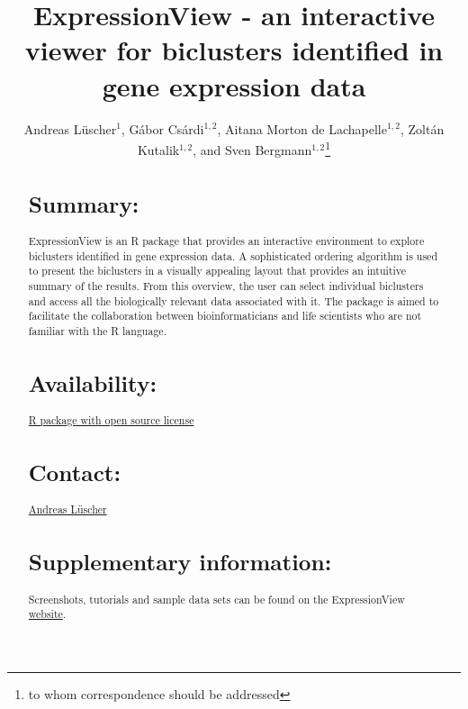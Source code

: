 \documentclass[round]{bioinfo}
\begin{document}
\application{}
\title[ExpressionView]{ExpressionView - an interactive viewer for biclusters identified in gene expression data}
\author[Andreas L\"uscher, G\'abor Cs\'ardi, Aitana Morton de Lachapelle, Zolt\'an Kutalik, and Sven Bergmann]{Andreas L\"uscher$^1$, G\'abor Cs\'ardi$^{1,2}$, Aitana Morton de Lachapelle$^{1,2}$, Zolt\'an Kutalik$^{1,2}$, and Sven Bergmann$^{1,2}$\footnote{to whom correspondence should be addressed}}
\address{
	$^{1}$Swiss Institute of Bioinformatics, Lausanne, Switzerland\\
	$^{2}$Department of Medical Genetics, University of Lausanne, Lausanne, Switzerland
}



\maketitle

\begin{abstract}

\section{Summary:}
ExpressionView is an R package that provides an interactive environment to explore biclusters identified in gene expression data. A sophisticated ordering algorithm is used to present the biclusters in a visually appealing layout that provides an intuitive summary of the results. From this overview, the user can select individual biclusters and access all the biologically relevant data associated with it. The package is aimed to facilitate the collaboration between bioinformaticians and life scientists who are not familiar with the R language.

\section{Availability:} 
\href{http://www2.unil.ch/cbg/index.php?title=ExpressionView}{R package with open source license}

\section{Contact:} 
\href{andreas.luescher@a3.epfl.ch}{Andreas L\"uscher}

\section{Supplementary information:}
Screenshots, tutorials and sample data sets can be found on the ExpressionView \href{http://www2.unil.ch/cbg/index.php?title=ExpressionView}{website}.

\end{abstract}
\end{document}

